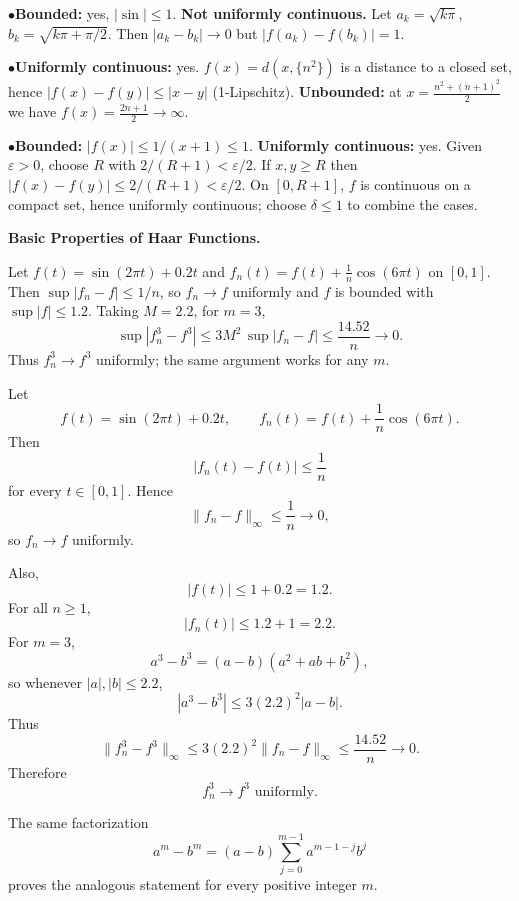 \begin{solution}
\par\smallskip\noindent\(\bullet\)\quad \textbf{Bounded:} yes, $|\sin|\le1$. \textbf{Not uniformly continuous.}
	Let $a_k=\sqrt{k\pi}$, $b_k=\sqrt{k\pi+\pi/2}$. Then $|a_k-b_k|\to0$ but
	$|f(a_k)-f(b_k)|=1$.
	\par\smallskip\noindent\(\bullet\)\quad \textbf{Uniformly continuous:} yes. $f(x)=d(x,\{n^2\})$ is a distance to a closed set,
	hence $|f(x)-f(y)|\le|x-y|$ (1-Lipschitz).
	\textbf{Unbounded:} at $x=\tfrac{n^2+(n+1)^2}{2}$ we have $f(x)=\tfrac{2n+1}{2}\to\infty$.
	\par\smallskip\noindent\(\bullet\)\quad \textbf{Bounded:} $|f(x)|\le 1/(x+1)\le1$.
	\textbf{Uniformly continuous:} yes. Given $\varepsilon>0$, choose $R$ with $2/(R+1)<\varepsilon/2$.
	If $x,y\ge R$ then $|f(x)-f(y)|\le 2/(R+1)<\varepsilon/2$.
	On $[0,R+1]$, $f$ is continuous on a compact set, hence uniformly continuous;
	choose $\delta\le1$ to combine the cases.

\bigskip
\end{solution}

\begin{problem}[CP-II-0207]
\label{prob:cp-ii-0207}
\textbf{Basic Properties of Haar Functions.}

\hspace*{1.5em}Let $f(t)=\sin(2\pi t)+0.2t$ and $f_n(t)=f(t)+\frac{1}{n}\cos(6\pi t)$ on $[0,1]$.
	Then $\sup|f_n-f|\le 1/n$, so $f_n\to f$ uniformly and $f$ is bounded with
	$\sup|f|\le 1.2$. Taking $M=2.2$, for $m=3$,
	\[
	\sup|f_n^3-f^3|\le 3M^2\,\sup|f_n-f|\le \frac{14.52}{n}\to0.
	\]
	Thus $f_n^3\to f^3$ uniformly; the same argument works for any $m$.
\end{problem}

\begin{solution}
Let
\[
f(t)=\sin(2\pi t)+0.2t,
\qquad
f_n(t)=f(t)+\frac1n\cos(6\pi t).
\]
Then
\[
|f_n(t)-f(t)|
\le
\frac1n
\]
for every \(t\in[0,1]\). Hence
\[
\|f_n-f\|_\infty\le\frac1n\to0,
\]
so \(f_n\to f\) uniformly.

Also,
\[
|f(t)|\le1+0.2=1.2.
\]
For all \(n\ge1\),
\[
|f_n(t)|
\le
1.2+1=2.2.
\]
For \(m=3\),
\[
a^3-b^3
=
(a-b)(a^2+ab+b^2),
\]
so whenever \(|a|,|b|\le2.2\),
\[
|a^3-b^3|
\le
3(2.2)^2|a-b|.
\]
Thus
\[
\|f_n^3-f^3\|_\infty
\le
3(2.2)^2\|f_n-f\|_\infty
\le
\frac{14.52}{n}
\to0.
\]
Therefore
\[
\boxed{f_n^3\to f^3\text{ uniformly}.}
\]

The same factorization
\[
a^m-b^m
=
(a-b)\sum_{j=0}^{m-1}a^{m-1-j}b^j
\]
proves the analogous statement for every positive integer \(m\).
\end{solution}


